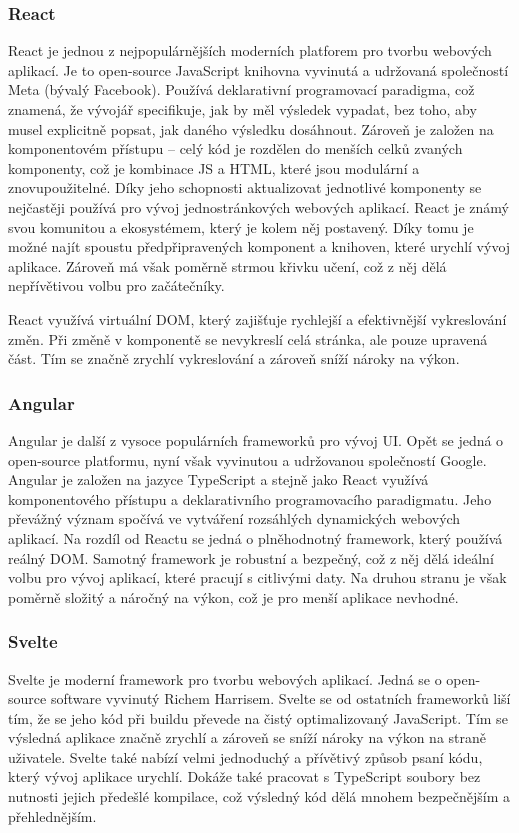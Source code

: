 \subsubsection{React}
React je jednou z nejpopulárnějších moderních platforem pro tvorbu webových aplikací. Je to open-source JavaScript knihovna vyvinutá a udržovaná společností Meta (bývalý Facebook). Používá deklarativní programovací paradigma, což znamená, že vývojář specifikuje, jak by měl výsledek vypadat, bez toho, aby musel explicitně popsat, jak daného výsledku dosáhnout. Zároveň je založen na komponentovém přístupu -- celý kód je rozdělen do menších celků zvaných komponenty, což je kombinace JS a HTML, které jsou modulární a znovupoužitelné. Díky jeho schopnosti aktualizovat jednotlivé komponenty se nejčastěji používá pro vývoj jednostránkových webových aplikací. React je známý svou komunitou a ekosystémem, který je kolem něj postavený. Díky tomu je možné najít spoustu předpřipravených komponent a knihoven, které urychlí vývoj aplikace. Zároveň má však poměrně strmou křivku učení, což z něj dělá nepřívětivou volbu pro začátečníky.

React využívá virtuální DOM, který zajišťuje rychlejší a efektivnější vykreslování změn. Při změně v komponentě se nevykreslí celá stránka, ale pouze upravená část. Tím se značně zrychlí vykreslování a zároveň sníží nároky na výkon.\cite{react, what_react_is_and_why_it_matters,angular_vs_react}

\subsubsection{Angular}
Angular je další z vysoce populárních frameworků pro vývoj UI. Opět se jedná o open-source platformu, nyní však vyvinutou a udržovanou společností Google. Angular je založen na jazyce TypeScript a stejně jako React využívá komponentového přístupu a deklarativního programovacího paradigmatu. Jeho převážný význam spočívá ve vytváření rozsáhlých dynamických webových aplikací. Na rozdíl od Reactu se jedná o plněhodnotný framework, který používá reálný DOM. Samotný framework je robustní a bezpečný, což z něj dělá ideální volbu pro vývoj aplikací, které pracují s citlivými daty. Na druhou stranu je však poměrně složitý a náročný na výkon, což je pro menší aplikace nevhodné.\cite{what_is_angular,angular_vs_react}

\subsubsection{Svelte}
Svelte je moderní framework pro tvorbu webových aplikací. Jedná se o open-source software vyvinutý Richem Harrisem. Svelte se od ostatních frameworků liší tím, že se jeho kód při buildu převede na čistý optimalizovaný JavaScript. Tím se výsledná aplikace značně zrychlí a zároveň se sníží nároky na výkon na straně uživatele. Svelte také nabízí velmi jednoduchý a přívětivý způsob psaní kódu, který vývoj aplikace urychlí. Dokáže také pracovat s TypeScript soubory bez nutnosti jejich předešlé kompilace, což výsledný kód dělá mnohem bezpečnějším a přehlednějším.\cite{svelte_and_why_you_should_consider_it,svelte}

